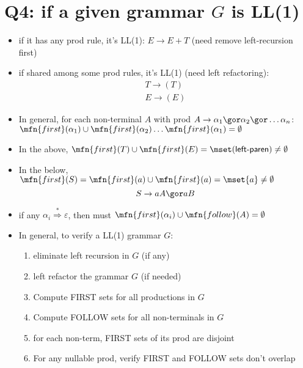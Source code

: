 \section*{Q4: if a given grammar $G$ is LL(1)}
\begin{itemize}
\item if it has any  prod rule, it's  LL(1): $E\to E+ T$ (need remove left-recursion first)
\item if  shared among some prod rules, it's  LL(1) (need left refactoring):
  \begin{align*}
    T\to (T) \\
    E\to (E)
  \end{align*}
\item In general, for each non-terminal $A$ with prod $A\to \alpha_1\gor \alpha_2\gor\ldots\alpha_n$: $\mfn{first}(\alpha_1)\cup\mfn{first}(\alpha_2)\ldots\mfn{first}(\alpha_1) = \emptyset$
\item In the above, $\mfn{first}(T)\cup\mfn{first}(E) = \mset(\textsf{left-paren})\neq \emptyset$
\item In the below, $\mfn{first}(S)=\mfn{first}(a)\cup\mfn{first}(a)=\mset{a}\neq\emptyset$
  \[
    S\to aA \gor aB
  \]
\item if any $\alpha_i \overset{*}{\Rightarrow} \varepsilon$, then must $\mfn{first}(\alpha_i)\cup\mfn{follow}(A)=\emptyset$
\item In general, to verify a LL(1) grammar $G$:
  \begin{enumerate}
  \item eliminate left recursion in $G$ (if any)
  \item left refactor the grammar $G$ (if needed)
  \item Compute FIRST sets for all productions in $G$
  \item Compute FOLLOW sets for all non-terminals in $G$
  \item for each non-term, FIRST sets of its prod are disjoint
  \item For any nullable prod, verify FIRST and FOLLOW sets don't overlap
  \end{enumerate}
\end{itemize}
